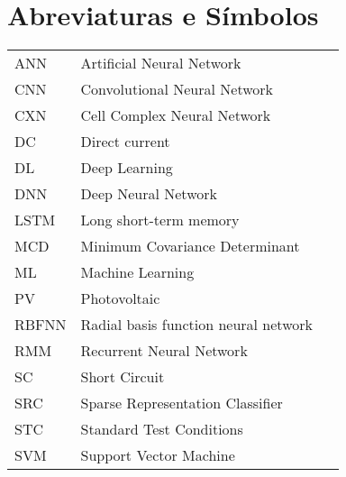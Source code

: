 \chapter*{Abreviaturas e Símbolos}

\begin{flushleft}
\begin{tabular}{l p{0.8\linewidth}}
ANN        & Artificial Neural Network \\
CNN        & Convolutional Neural Network \\
CXN       & Cell Complex Neural Network \\
DC      & Direct current \\
DL      & Deep Learning \\
DNN      & Deep Neural Network \\
LSTM      & Long short-term memory \\
MCD      & Minimum Covariance Determinant\\
ML          & Machine Learning \\
PV      & Photovoltaic \\
RBFNN   & Radial basis function neural network \\
RMM     & Recurrent Neural Network \\
SC      & Short Circuit \\
SRC     & Sparse Representation Classifier \\
STC      & Standard Test Conditions \\
SVM         & Support Vector Machine
\end{tabular}
\end{flushleft}


